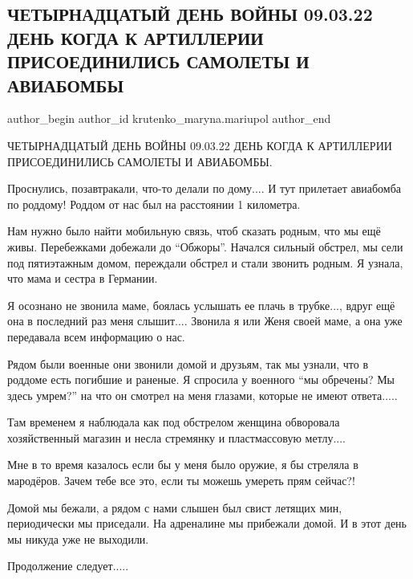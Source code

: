  
 
 
 
 

\subsection{ЧЕТЫРНАДЦАТЫЙ ДЕНЬ ВОЙНЫ 09.03.22 ДЕНЬ КОГДА К АРТИЛЛЕРИИ ПРИСОЕДИНИЛИСЬ САМОЛЕТЫ И АВИАБОМБЫ}
\label{sec:09_03_2023.fb.krutenko_maryna.mariupol.1.14_den_09_03_artilleria_samolety_aviabomby}

\ifcmt
 author_begin
   author_id krutenko_maryna.mariupol
 author_end
\fi

ЧЕТЫРНАДЦАТЫЙ ДЕНЬ ВОЙНЫ 09.03.22 ДЕНЬ КОГДА К АРТИЛЛЕРИИ ПРИСОЕДИНИЛИСЬ
САМОЛЕТЫ И АВИАБОМБЫ. 

Проснулись, позавтракали, что-то делали по дому.... И тут прилетает авиабомба по
роддому! Роддом от нас был на расстоянии 1 километра.   

Нам нужно было найти мобильную связь, чтоб сказать родным, что мы ещё живы.
Перебежками добежали до \enquote{Обжоры}. Начался сильный обстрел, мы сели под
пятиэтажным домом, переждали обстрел и  стали звонить родным. Я узнала, что
мама и сестра в Германии. 

Я осознано не звонила маме, боялась услышать ее плачь в трубке..., вдруг ещё она
в последний раз меня слышит.... Звонила я или Женя своей маме, а она уже
передавала всем информацию о нас. 

Рядом были военные они звонили домой и друзьям, так мы узнали, что в роддоме
есть погибшие и раненые. Я спросила у военного \enquote{мы обречены? Мы здесь умрем?}
на что он смотрел на меня глазами, которые не имеют ответа.....

Там временем я наблюдала как под обстрелом женщина обворовала хозяйственный
магазин и несла стремянку и пластмассовую метлу....

Мне в то время казалось если бы у меня было оружие, я бы стреляла в мародёров.
Зачем тебе все это, если ты можешь умереть прям сейчас?!

Домой мы бежали, а рядом с нами слышен был свист летящих мин, периодически мы
приседали. На адреналине мы прибежали домой. И в этот день мы никуда уже не
выходили. 

Продолжение следует.....

